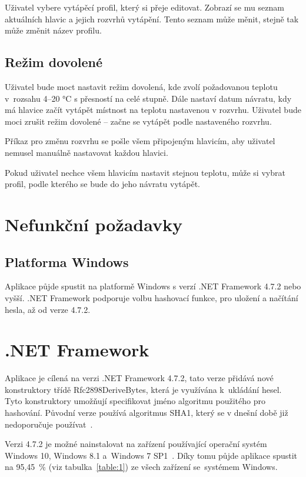 \documentclass[thesis=B,czech]{FITthesis}[2012/10/20]
\begin{document}
Uživatel vybere vytápěcí profil, který si přeje editovat. Zobrazí se mu seznam aktuálních hlavic a jejich rozvrhů vytápění. Tento seznam může měnit, stejně tak může změnit název profilu.

\subsection{Režim dovolené}

Uživatel bude moct nastavit režim dovolená, kde zvolí požadovanou teplotu v~rozsahu 4--20 °C s přesností na celé stupně. Dále nastaví datum návratu, kdy má hlavice začít vytápět místnost na teplotu nastavenou v rozvrhu. Uživatel bude moci zrušit režim dovolené – začne se vytápět podle nastaveného rozvrhu.

Příkaz pro změnu rozvrhu se pošle všem připojeným hlavicím, aby uživatel nemusel manuálně nastavovat každou hlavici.

Pokud uživatel nechce všem hlavicím nastavit stejnou teplotu, může si vybrat profil, podle kterého se bude do jeho návratu vytápět.

\section{Nefunkční požadavky}

\subsection{Platforma Windows}

Aplikace půjde spustit na platformě Windows s verzí .NET Framework 4.7.2 nebo vyšší. .NET Framework podporuje volbu hashovací funkce, pro uložení a načítání hesla, až od verze 4.7.2.

\section{.NET Framework}

Aplikace je cílená na verzi .NET Framework 4.7.2, tato verze přidává nové konstruktory třídě Rfc2898DeriveBytes, která je využívána k~ukládání hesel. Tyto konstruktory umožňují specifikovat jméno algoritmu použitého pro hashování. Původní verze používá algoritmus SHA1, který se v dnešní době již nedoporučuje používat~\cite{netNews}.

Verzi 4.7.2 je možné nainstalovat na zařízení používající operační systém Windows 10, Windows 8.1 a~Windows 7 SP1~\cite{netNews}. Díky tomu půjde aplikace spustit na 95,45~\% (viz tabulka~\ref{table:1}) ze všech zařízení se~systémem Windows. 
\end{document}
